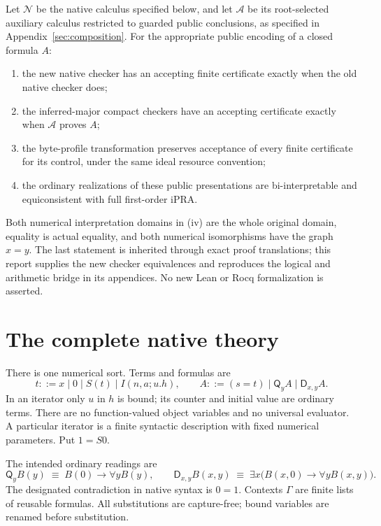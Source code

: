 \documentclass[11pt,letterpaper]{article}
\theoremstyle{definition}
\newcommand{\D}{\mathsf D}
\newcommand{\Q}{\mathsf Q}
\begin{document}
Let $\mathcal N$ be the native calculus specified below, and let
$\mathcal A$ be its root-selected auxiliary calculus restricted to guarded
public conclusions, as specified in Appendix~\ref{sec:composition}.
For the appropriate public encoding of a closed formula $A$:
\begin{enumerate}[label=(\roman*)]
\item the new native checker has an accepting finite certificate exactly
      when the old native checker does;
\item the inferred-major compact checkers have an accepting certificate
      exactly when $\mathcal A$ proves $A$;
\item the byte-profile transformation preserves acceptance of every finite
      certificate for its control, under the same ideal resource convention;
\item the ordinary realizations of these public presentations are
      bi-interpretable and equiconsistent with full first-order iPRA.
\end{enumerate}
Both numerical interpretation domains in (iv) are the whole original
domain, equality is actual equality, and both numerical isomorphisms have
the graph $x=y$. The last statement is inherited through exact proof
translations; this report supplies the new checker equivalences and
reproduces the logical and arithmetic bridge in its appendices. No new
Lean or Rocq formalization is asserted.

\section{The complete native theory}
\label{sec:main-theory}

There is one numerical sort. Terms and formulas are
\[
 t ::= x\mid 0\mid S(t)\mid I(n,a;u.h),\qquad
 A ::= (s=t)\mid\Q_y A\mid\D_{x,y}A.
\]
In an iterator only $u$ in $h$ is bound; its counter and initial value are
ordinary terms. There are no function-valued object variables and no
universal evaluator. A particular iterator is a finite syntactic
description with fixed numerical parameters. Put $1=S0$.

The intended ordinary readings are
\[
 \Q_yB(y)\;\equiv\;B(0)\to\forall y B(y),\qquad
 \D_{x,y}B(x,y)\;\equiv\;
 \exists x\bigl(B(x,0)\to\forall y B(x,y)\bigr).
\]
The designated contradiction in native syntax is $0=1$.
Contexts $\Gamma$ are finite lists of reusable formulas. All substitutions
are capture-free; bound variables are renamed before substitution.
\end{document}
